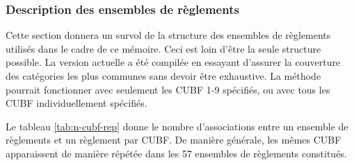         \subsubsection{Description des ensembles de règlements}
            Cette section donnera un survol de la structure des ensembles de règlements utilisés dans le cadre de ce mémoire. Ceci est loin d'être la seule structure possible. La version actuelle a été compilée en essayant d'assurer la couverture des catégories les plus communes sans devoir être  exhaustive. La méthode pourrait fonctionner avec seulement les \ac{CUBF} 1-9 spécifiés, ou avec tous les \ac{CUBF} individuellement spécifiés. \par
            Le tableau \ref{tab:n-cubf-rep} donne le nombre d'associations entre un ensemble de règlements et un règlement par \ac{CUBF}. De manière générale, les mêmes \ac{CUBF} apparaissent de manière répétée dans les 57 ensembles de règlements constitués.
            \newcommand{\TitreNombreDefinitionsCUBF}{Nombre de définitions par utilisation du sol}
